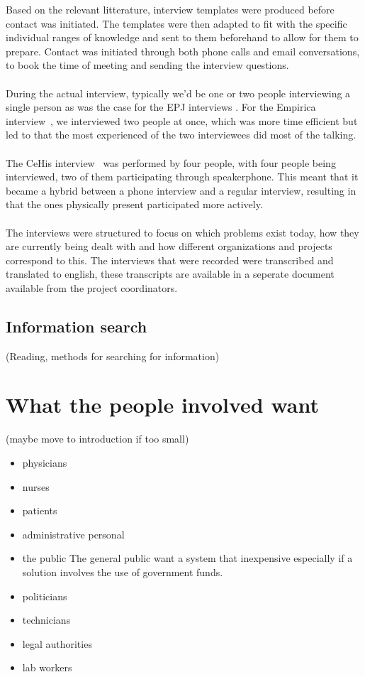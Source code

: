 \documentclass[14pt]{article}
\begin{document}
Based on the relevant litterature, interview templates were produced before contact was initiated. The templates were then adapted to fit with the specific individual ranges of knowledge and sent to them beforehand to allow for them to prepare. Contact was initiated through both phone calls and email conversations, to book the time of meeting and sending the interview questions.
\\\\
During the actual interview, typically we'd be one or two people interviewing a single person as was the case for the EPJ interviews \cite{EPJ1} \cite{EPJ2}. For the Empirica interview~\cite{Empirica}, we interviewed two people at once, which was more time efficient but led to that the most experienced of the two interviewees did most of the talking.
\\\\
The CeHis interview~\cite{CeHis} was performed by four people, with four people being interviewed, two of them participating through speakerphone. This meant that it became a hybrid between a phone interview and a regular interview, resulting in that the ones physically present participated more actively. 
\\\\
The interviews were structured to focus on which problems exist today, how they are currently being dealt with and how different organizations and projects correspond to this. The interviews that were recorded were transcribed and translated to english, these transcripts are available in a seperate document available from the project coordinators.

\subsection{Information search}
(Reading, methods for searching for information)

\newpage

\section{What the people involved want}
(maybe move to introduction if too small)
\begin{itemize}
\item physicians
\item nurses
\item patients
\item administrative personal
\item the public
The general public want a system that inexpensive especially if a solution involves the use of government funds.
\item politicians
\item technicians
\item legal authorities
\item lab workers
\end{itemize}
\end{document}
